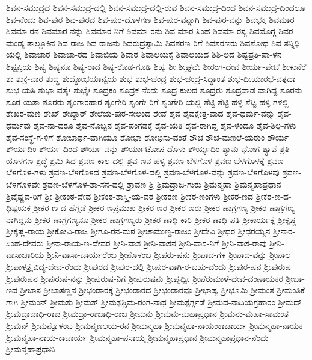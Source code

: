 {ಶಿವನ-ಸಮುದ್ರದ
ಶಿವನ-ಸಮುದ್ರ-ದಲ್ಲಿ
ಶಿವನ-ಸಮುದ್ರ-ದಲ್ಲಿ-ರುವ
ಶಿವನ-ಸಮುದ್ರ-ದಿಂದ
ಶಿವನ-ಸಮುದ್ರ-ದಿಂದಲೂ
ಶಿವ-ನೆಂದು
ಶಿವ-ಪುರ
ಶಿವ-ಪುರದ
ಶಿವ-ಪುರ-ದೊಳಗಣ
ಶಿವ-ಪುರ-ವನ್ನಾಗಿ
ಶಿವ-ಪುರ-ವನ್ನು
ಶಿವಭಕ್ತ
ಶಿವಮಾರ
ಶಿವಮಾ-ರನ
ಶಿವಮಾರ-ನನ್ನು
ಶಿವಮಾರ-ನಿಗೆ
ಶಿವಮಾ-ರನು
ಶಿವ-ಮಾರ-ಸಿಂಹ
ಶಿವಮಾ-ರಸ್ಯ
ಶಿವಮೊಗ್ಗ
ಶಿವರ-ಮಂಡ್ಯ-ತಾಲ್ಲೂಕಿನ
ಶಿವ-ರಾಜ
ಶಿವ-ರಾಜನು
ಶಿವರುದ್ರಸ್ವಾಮಿ
ಶಿವಶರಣ-ರಿಗೆ
ಶಿವಶರಣರು
ಶಿವಶೋಧ
ಶಿವ-ಸನ್ನಿಧಿ-ಯಲ್ಲಿ
ಶಿವಾಚಾರ
ಶಿವಾಚಾ-ರದ
ಶಿವಾಜಿಯ
ಶಿವಾರ
ಶಿವಾಲಯಕ್ಕೆ
ಶಿವಾಲಯದ
ಶಿಶಿ-ಲದ
ಶಿಷ್ಟಪ್ರತಿ-ಪಾ-ಳನ
ಶಿಷ್ಟಪ್ರಿಯ
ಶಿಷ್ಯ
ಶಿಷ್ಯನೂ
ಶಿಷ್ಯ-ರಾದ
ಶಿಷ್ಯ-ರೊಡ-ಗೂಡಿ
ಶಿಹ್ವ
ಶೀ
ಶೀಘ್ರವೇ
ಶೀರಂಗ-ದೇವ
ಶೀರ್ಯ-ಪೇಟೆ
ಶೀಳುನೆರೆ
ಶು
ಶುಕ್ರ-ವಾರ
ಶುದ್ಧ
ಶುದ್ಧೋಭಯಾನ್ವಯ
ಶುಭ
ಶುಭ-ಚಂದ್ರ
ಶುಭ-ಚಂದ್ರ-ಸಿದ್ಧಾಂತ
ಶುಭ-ದೀಯಾರಭ-ವತ್ಸದಾ
ಶುಭ-ಯಸಿ
ಶುಭಾ-ವತೈಃ
ಶುಭೈಃ
ಶೂದ್ರಕಂ
ಶೂದ್ರಕ-ನೆಂದು
ಶೂದ್ರ-ಕುಲದ
ಶೂದ್ರರು
ಶೂದ್ರವಾಡ-ವಾಗಿದ್ದ
ಶೂರನು
ಶೂರ-ಯತಾ
ಶೂರರು
ಶೃಂಗಾರಹಾರ
ಶೃಂಗೇರಿ
ಶೃಂಗೇ-ರಿಗೆ
ಶೃಂಗೇರಿ-ಯಲ್ಲಿ
ಶೆಟ್ಟಿ
ಶೆಟ್ಟಿ-ಹಳ್ಳಿ
ಶೆಟ್ಟಿ-ಹಳ್ಳಿ-ಗಳಲ್ಲಿ
ಶೇಖರ-ಮಣಿ
ಶೇಖ್
ಶೇಖ್ದಾರ್
ಶೇಲೆಯ-ಪುರ-ಸೇಲಂದ
ಶೇವೆ
ಶೈವ
ಶೈವಕ್ಷೇತ್ರ-ವಾದ
ಶೈವ-ಧರ್ಮ-ವನ್ನು
ಶೈವ-ಧರ್ಮವು
ಶೈವ-ನಾ-ದರೂ
ಶೈವ-ನೊಬ್ಬನ
ಶೈವ-ಪಂಗಡಕ್ಕೆ
ಶೈವ-ಯತಿ
ಶೈವ-ರಾಗಿದ್ದ
ಶೈವ-ಳೆಂದೂ
ಶೈವ-ಶಿಲ್ಪ-ಗಳು
ಶೈವ-ಸಂಸ್ಥೆ-ಗ-ಳಿಗೆ
ಶೋಬಾರ್ಥ-ವಾಗಿಯೂ
ಶೋಭಾ
ಶೋಭಿಸು-ವಂತೆ
ಶೌಚ
ಶೌಚ-ಮಣಲೆ-ಯರುಂ
ಶೌರ್ಯ
ಶೌರ್ಯದಿಂ
ಶೌರ್ಯ-ದಿಂದ
ಶೌರ್ಯ-ವನ್ನು
ಶೌರ್ಯಾಟೋಪ-ದೊಳು
ಶೌರ್ಯ್ಯದಿಂ
ಶ್ಯಾನು-ಭೋಗ
ಶ್ಯಾವೆ
ಶ್ರತಿ-ಯೊಳಗಣ
ಶ್ರದ್ಧೆ
ಶ್ರಮಿ-ಸಿದ
ಶ್ರವಣ-ಕಾಲ-ದಲ್ಲಿ
ಶ್ರವ-ಣನ-ಹಳ್ಳಿ
ಶ್ರವಣ-ಬೆಳಗೊಳ
ಶ್ರವಣ-ಬೆಳಗೊಳಕ್ಕೆ
ಶ್ರವಣ-ಬೆಳಗೊಳ-ಗಳು
ಶ್ರವಣ-ಬೆಳಗೊಳದ
ಶ್ರವಣ-ಬೆಳಗೊಳ-ದಲ್ಲಿ
ಶ್ರವಣ-ಬೆಳಗೊಳ-ವನ್ನು
ಶ್ರವಣ-ಬೆಳಗೊಳವು
ಶ್ರವಣ-ಬೆಳಗೊಳವೇ
ಶ್ರವಣ-ಬೆಳಗೊಳ-ಶಾ-ಸನ-ದಲ್ಲಿ
ಶ್ರಾವಣ
ಶ್ರಿ
ಶ್ರಿಮದ್ರಾಜ-ಗುರು
ಶ್ರಿಮನ್ಮಹಾ
ಶ್ರಿಮನ್ಮಹಾಪ್ರಧಾನ
ಶ್ರಿವೈಷ್ಣವ-ರಿಗೆ
ಶ್ರೀ
ಶ್ರೀಕಂಠ-ದೇವ
ಶ್ರೀಕಂಠ-ಶಾಸ್ತ್ರಿ-ಯ-ವರ
ಶ್ರೀಕರಣ
ಶ್ರೀಕರ-ಣಂಗಳು
ಶ್ರೀಕರ-ಣದ
ಶ್ರೀಕರ-ಣ-ದ-ಧಿಷ್ಟಯಕ
ಶ್ರೀಕರ-ಣ-ದ-ಹೆಗ್ಗಡೆ
ಶ್ರೀಕರ-ಣಪ್ರಮುಖ
ಶ್ರೀಕರ-ಣರ
ಶ್ರೀಕರ-ಣರು
ಶ್ರೀಕರ-ಣಾಗ್ರಗಣ್ಯ
ಶ್ರೀಕರ-ಣಾಗ್ರಗಣ್ಯ-ನಾಗಿದ್ದನು
ಶ್ರೀಕರ-ಣಾಗ್ರಗಣ್ಯನೂ
ಶ್ರೀಕರ-ಣಾಗ್ರಗಣ್ಯರು
ಶ್ರೀಕರ-ಣಾಧಿ-ಕಾರಿ
ಶ್ರೀಕರ-ಣಾಧಿ-ಪತಿ
ಶ್ರೀಕಾರ್ಯಕ್ಕೆ
ಶ್ರೀಕೃಷ್ಣ
ಶ್ರೀಕೃಷ್ಣ-ರಾಯ
ಶ್ರೀಕೋವಿ-ರಾಜ
ಶ್ರೀಗೂ-ರನ-ಮಠ
ಶ್ರೀಚಾಮುಣ್ಡ-ರಾಜಂ
ಶ್ರೀದೇವಿ
ಶ್ರೀಧರ
ಶ್ರೀಧರಯ್ಯನ
ಶ್ರೀನಾರ-ಸಿಂಹ-ದೇವರು
ಶ್ರೀನಾ-ರಾಯ-ಣ-ದೇವರ
ಶ್ರೀನಿ-ವಾಸ
ಶ್ರೀನಿ-ವಾಸನ
ಶ್ರೀನಿ-ವಾಸ-ನಿಗೆ
ಶ್ರೀನಿ-ವಾಸ-ರಾವು
ಶ್ರೀನಿ-ವಾಸಾಚಾರಿಯ
ಶ್ರೀನಿ-ವಾಸಾ-ಚಾರ್ಯರೆಂಬ
ಶ್ರೀನೊಳಂಬ
ಶ್ರೀಪರು-ಷನು
ಶ್ರೀಪಾದ-ಗಳ
ಶ್ರೀಪಾದ-ವನ್ನು
ಶ್ರೀಪಾಲ
ಶ್ರೀಪಾಳತ್ರೈವಿದ್ಯ-ದೇವ-ರೆಂದು
ಶ್ರೀಪುರದ
ಶ್ರೀಪುರ-ದಲ್ಲಿ
ಶ್ರೀಪುರ-ವಾಗಿ-ರ-ಬಹು-ದೆಂದು
ಶ್ರೀಪುರ-ಷನ
ಶ್ರೀಪುರುಷ
ಶ್ರೀಪುರುಷನ
ಶ್ರೀಪುರುಷ-ನನ್ನು
ಶ್ರೀಪುರುಷ-ನಿಗೆ
ಶ್ರೀಪುರುಷನು
ಶ್ರೀಪೃಥ್ವೀ
ಶ್ರೀಪೆರುಮಾಳೆ-ದೇವ-ದಂಣಾಯಕರ
ಶ್ರೀಬಾ-ಣದ
ಶ್ರೀಬಾಸ
ಶ್ರೀಬಾಸಣ್ಣನ
ಶ್ರೀಭಂಡಾರಕ್ಕೆ
ಶ್ರೀಭಂಡಾರದ
ಶ್ರೀಭಂಡಾರವೂ
ಶ್ರೀಭಾಷ್ಯ
ಶ್ರೀಭೂಮಿ
ಶ್ರೀಮಂತ
ಶ್ರೀಮಂತಿಕೆ-ಗಾಗಿ
ಶ್ರೀಮಂನ್
ಶ್ರೀಮತು
ಶ್ರೀಮತ್
ಶ್ರೀಮತ್ಪಶ್ಚಿಮ-ರಂಗ-ನಾಥ
ಶ್ರೀಮತ್ಪೆರ್ಗ್ಗಡೆ
ಶ್ರೀಮದ-ನಾದಿಯಗ್ರಹಾರಂ
ಶ್ರೀಮದ್
ಶ್ರೀಮದ್ರಾಜಾಧಿ-ರಾಜ
ಶ್ರೀಮದ್ರಾ-ರಾಜಾಧಿ-ರಾಜ
ಶ್ರೀಮನು
ಶ್ರೀಮನು-ಮಹಾಪ್ರಧಾನ
ಶ್ರೀಮನು-ಮಹಾ-ಸಾಮಂತ
ಶ್ರೀಮನ್
ಶ್ರೀಮನ್ನೊಳಂಬ
ಶ್ರೀಮನ್ಮಣಲಯ-ರನ
ಶ್ರೀಮನ್ಮಹಾ
ಶ್ರೀಮನ್ಮಹಾ-ನಾಯಂಕಾಚಾರ್ಯ
ಶ್ರೀಮನ್ಮಹಾ-ನಾಯಕ
ಶ್ರೀಮನ್ಮಹಾ-ನಾಯ-ಕಾಚಾರ್ಯ
ಶ್ರೀಮನ್ಮಹಾ-ಪಸಾಯ್ತ
ಶ್ರೀಮನ್ಮಹಾಪ್ರಧಾನ
ಶ್ರೀಮನ್ಮಹಾಪ್ರಧಾನ-ನೆಂದು
ಶ್ರೀಮನ್ಮಹಾಪ್ರಧಾನಿ
}
